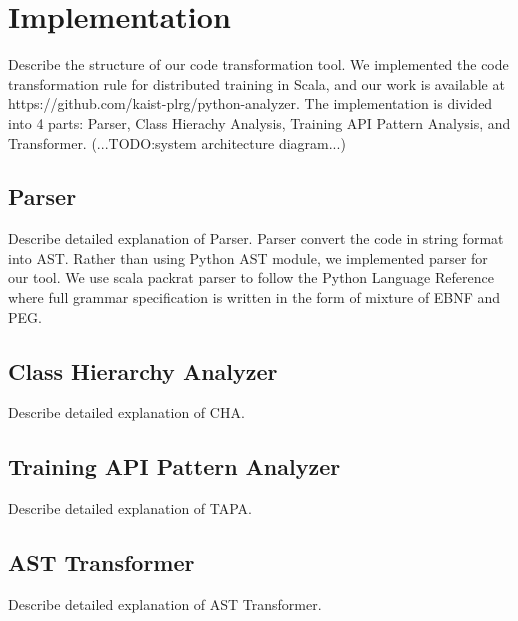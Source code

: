 \section{Implementation}\label{sec:impl}
Describe the structure of our code transformation tool.
We implemented the code transformation rule for distributed training in Scala,
and our work is available at https://github.com/kaist-plrg/python-analyzer.
The implementation is divided into 4 parts:
Parser, Class Hierachy Analysis,
Training API Pattern Analysis, and Transformer.
(...TODO:system architecture diagram...)

\subsection{Parser}
Describe detailed explanation of Parser.
Parser convert the code in string format into AST.
Rather than using Python AST module, we implemented parser for our tool.
We use scala packrat parser to follow the Python Language Reference
where full grammar specification is written in the form of mixture of EBNF and PEG.

\subsection{Class Hierarchy Analyzer}
Describe detailed explanation of CHA.

\subsection{Training API Pattern Analyzer}
Describe detailed explanation of TAPA.

\subsection{AST Transformer}
Describe detailed explanation of AST Transformer.

